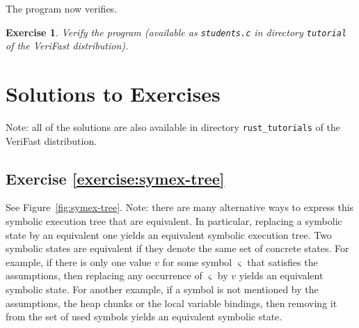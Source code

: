 \documentclass{article}
\newtheorem{exercise}{Exercise}
\begin{document}
The program now verifies.

\begin{exercise}
Verify the program (available as \lstinline!students.c! in
directory \lstinline!tutorial! of the VeriFast distribution).
\end{exercise}

\section{Solutions to Exercises}

Note: all of the solutions are also available in directory \verb|rust_tutorials| of the VeriFast distribution.

\subsection{Exercise \ref{exercise:symex-tree}}

See Figure~\ref{fig:symex-tree}. Note: there are many alternative ways to express this symbolic execution tree that are equivalent. In particular, replacing a symbolic state by an equivalent one yields an equivalent symbolic execution tree. Two symbolic states are equivalent if they denote the same set of concrete states. For example, if there is only one value $v$ for some symbol $\varsigma$ that satisfies the assumptions, then replacing any occurrence of $\varsigma$ by $v$ yields an equivalent symbolic state. For another example, if a symbol is not mentioned by the assumptions, the heap chunks or the local variable bindings, then removing it from the set of used symbols yields an equivalent symbolic state.
\end{document}
